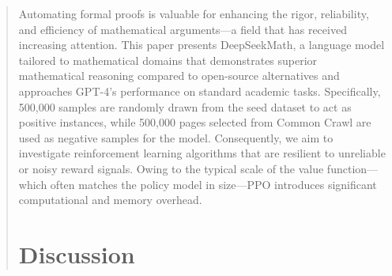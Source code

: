 \begin{abstract}
\begin{itemize}
\begin{itemize}[topsep=0pt]
\begin{itemize}[topsep=0pt]
Automating formal proofs is valuable for enhancing the rigor, reliability, and efficiency of mathematical arguments—a field that has received increasing attention. This paper presents DeepSeekMath, a language model tailored to mathematical domains that demonstrates superior mathematical reasoning compared to open-source alternatives and approaches GPT-4's performance on standard academic tasks. Specifically, 500,000 samples are randomly drawn from the seed dataset to act as positive instances, while 500,000 pages selected from Common Crawl are used as negative samples for the model. Consequently, we aim to investigate reinforcement learning algorithms that are resilient to unreliable or noisy reward signals. Owing to the typical scale of the value function—which often matches the policy model in size—PPO introduces significant computational and memory overhead. \section{Discussion}

\end{itemize}
\end{itemize}
\end{itemize}
\end{abstract}
